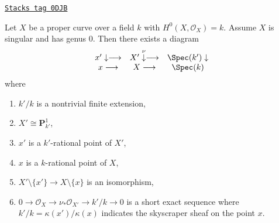\begin{lemma}
\label{curves-lemma-genus-zero-singular}
\href{https://stacks.math.columbia.edu/tag/0DJB}{\texttt{Stacks tag 0DJB}}

Let $X$ be a proper curve over a field $k$ with $H^0(X, \mathcal{O}_X) = k$.
Assume $X$ is singular and has genus $0$. Then there exists a diagram
$$
\begin{array}{ccc}x' \downarrow\longrightarrow & X' \overset{\nu}{\downarrow}\longrightarrow & \Spec(k') \downarrow \\ x \longrightarrow & X \longrightarrow & \Spec(k)\end{array}
$$
where
\begin{enumerate}
\item $k'/k$ is a nontrivial finite extension,
\item $X' \cong \mathbf{P}^1_{k'}$,
\item $x'$ is a $k'$-rational point of $X'$,
\item $x$ is a $k$-rational point of $X$,
\item $X' \setminus \{x'\} \to X \setminus \{x\}$ is an isomorphism,
\item $0 \to \mathcal{O}_X \to \nu_*\mathcal{O}_{X'} \to k'/k \to 0$
is a short exact sequence
where $k'/k = \kappa(x')/\kappa(x)$ indicates the skyscraper sheaf
on the point $x$.
\end{enumerate}
\end{lemma}

